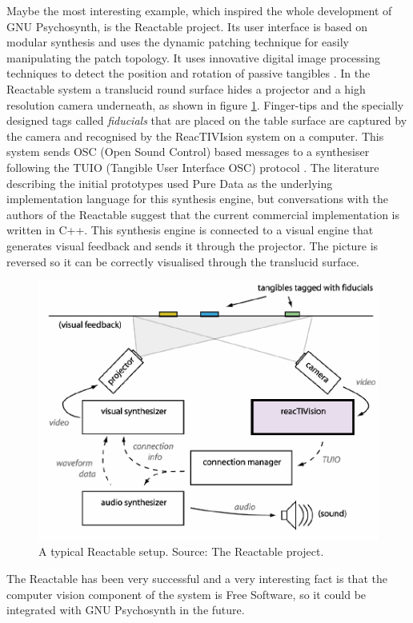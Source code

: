 Maybe the most interesting example, which inspired the whole
development of GNU Psychosynth, is the Reactable
project\cite{jorda07thereactable}. Its user interface is based on
modular synthesis and uses the dynamic patching technique for easily
manipulating the patch topology. It uses innovative digital image
processing techniques to detect the position and rotation of passive
tangibles \cite{bencina06improved}. In the Reactable system a
translucid round surface hides a projector and a high resolution
camera underneath, as shown in figure
\ref{fig:reactablesetup}. Finger-tips and the specially designed tags
called \emph{fiducials} that are placed on the table surface are
captured by the camera and recognised by the ReacTIVIsion system on a
computer. This system sends OSC\cite{center03osc} (Open Sound Control) based
messages to a synthesiser following the TUIO (Tangible User Interface
OSC) protocol \cite{kaltenbrunner05tuio}. The literature describing
the initial prototypes used Pure Data as the underlying implementation
language for this synthesis engine, but conversations with the authors
of the Reactable suggest that the current commercial implementation
is written in C++. This synthesis engine is connected to a visual
engine that generates visual feedback and sends it through the
projector. The picture is reversed so it can be correctly visualised
through the translucid surface.

\begin{figure}[h!]
\centering
\includegraphics[width=.7\textwidth]{pic/reactable-setup.png}
\caption[A typical Reactable setup.]{A typical Reactable
  setup. Source: The Reactable project.}
\label{fig:reactablesetup}
\end{figure}

The Reactable has been very successful and a very interesting fact is
that the computer vision component of the system is Free Software, so it
could be integrated with GNU Psychosynth in the future.

